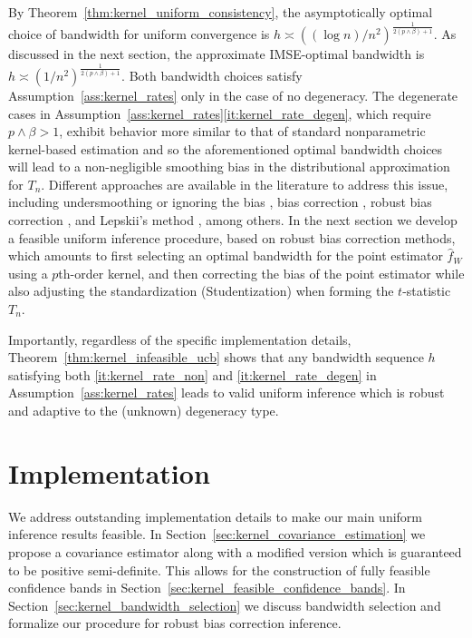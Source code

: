 \documentclass[11pt,lof]{puthesis}
\theoremstyle{break}
\theoremstyle{proof}
\begin{document}
By Theorem~\ref{thm:kernel_uniform_consistency}, the asymptotically optimal
choice of
bandwidth for uniform convergence is
$h \asymp ((\log n)/n^2)^{\frac{1}{2(p \wedge \beta)+1}}$.
As discussed in the next section, the approximate
IMSE-optimal bandwidth is $h \asymp (1/n^2)^{\frac{1}{2(p \wedge \beta)+1}}$.
Both bandwidth choices satisfy Assumption~\ref{ass:kernel_rates} only in the
case of
no degeneracy. The degenerate cases in
Assumption~\ref{ass:kernel_rates}\ref{it:kernel_rate_degen}, which require
$p \wedge \beta > 1$, exhibit behavior more similar to that of standard
nonparametric kernel-based estimation and so the aforementioned optimal
bandwidth choices will lead to a non-negligible smoothing bias in the
distributional approximation for $T_n$. Different approaches are available in
the literature to address this issue, including undersmoothing or ignoring the
bias \citep{hall2001bootstrapping}, bias correction \citep{hall1992effect},
robust bias correction \citep{calonico2018effect, calonico2022coverage}, and
Lepskii's method
\citep{lepskii1992asymptotically,birge2001alternative}, among others. In the
next section we develop a feasible uniform inference procedure, based on robust
bias correction methods, which amounts to first selecting an optimal bandwidth
for the point estimator $\hat{f}_W$ using a $p$th-order kernel, and then
correcting the bias of the point estimator while also adjusting the
standardization (Studentization) when forming the $t$-statistic $T_n$.

Importantly, regardless of the specific implementation details,
Theorem~\ref{thm:kernel_infeasible_ucb} shows that any bandwidth sequence $h$
satisfying both \ref{it:kernel_rate_non} and \ref{it:kernel_rate_degen}
in Assumption~\ref{ass:kernel_rates} leads to valid uniform inference which is
robust
and adaptive to the (unknown) degeneracy type.

\section{Implementation}
\label{sec:kernel_implementation}

We address outstanding implementation details to make our main uniform
inference results feasible. In Section~\ref{sec:kernel_covariance_estimation} we
propose a covariance estimator along with a modified version which is
guaranteed to be positive semi-definite. This allows for the construction of
fully feasible confidence bands in
Section~\ref{sec:kernel_feasible_confidence_bands}.
In Section~\ref{sec:kernel_bandwidth_selection} we discuss bandwidth selection
and
formalize our procedure for robust bias correction inference.
\end{document}
